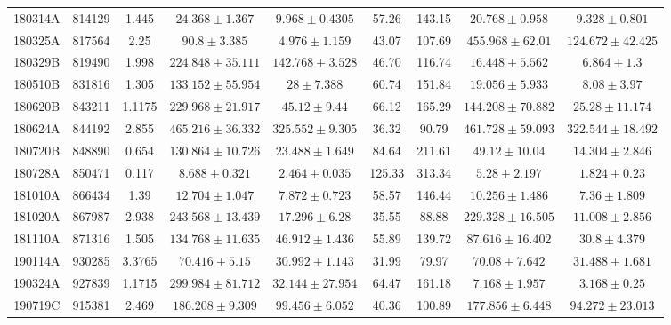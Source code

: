 \documentclass[prd,nofootinbib,preprintnumbers,floatfix]{revtex4}  %
\begin{document}
\begin{center}
\begin{longtable*}{|c|c|c|c|c|c|c|c|c|}
180314A	&	814129	&	1.445	&	$	24.368	\pm	1.367	$	&	$	9.968	\pm	0.4305	$	&	57.26	&	143.15	&	$	20.768	\pm	0.958	$	&	$	9.328	\pm	0.801	$	\\
180325A	&	817564	&	2.25	&	$	90.8	\pm	3.385	$	&	$	4.976	\pm	1.159	$	&	43.07	&	107.69	&	$	455.968	\pm	62.01	$	&	$	124.672	\pm	42.425	$	\\
180329B	&	819490	&	1.998	&	$	224.848	\pm	35.111	$	&	$	142.768	\pm	3.528	$	&	46.70	&	116.74	&	$	16.448	\pm	5.562	$	&	$	6.864	\pm	1.3	$	\\
180510B	&	831816	&	1.305	&	$	133.152	\pm	55.954	$	&	$	28	\pm	7.388	$	&	60.74	&	151.84	&	$	19.056	\pm	5.933	$	&	$	8.08	\pm	3.97	$	\\
180620B	&	843211	&	1.1175	&	$	229.968	\pm	21.917	$	&	$	45.12	\pm	9.44	$	&	66.12	&	165.29	&	$	144.208	\pm	70.882	$	&	$	25.28	\pm	11.174	$	\\
180624A	&	844192	&	2.855	&	$	465.216	\pm	36.332	$	&	$	325.552	\pm	9.305	$	&	36.32	&	90.79	&	$	461.728	\pm	59.093	$	&	$	322.544	\pm	18.492	$	\\
180720B	&	848890	&	0.654	&	$	130.864	\pm	10.726	$	&	$	23.488	\pm	1.649	$	&	84.64	&	211.61	&	$	49.12	\pm	10.04	$	&	$	14.304	\pm	2.846	$	\\
180728A	&	850471	&	0.117	&	$	8.688	\pm	0.321	$	&	$	2.464	\pm	0.035	$	&	125.33	&	313.34	&	$	5.28	\pm	2.197	$	&	$	1.824	\pm	0.23	$	\\
181010A	&	866434	&	1.39	&	$	12.704	\pm	1.047	$	&	$	7.872	\pm	0.723	$	&	58.57	&	146.44	&	$	10.256	\pm	1.486	$	&	$	7.36	\pm	1.809	$	\\
181020A	&	867987	&	2.938	&	$	243.568	\pm	13.439	$	&	$	17.296	\pm	6.28	$	&	35.55	&	88.88	&	$	229.328	\pm	16.505	$	&	$	11.008	\pm	2.856	$	\\
181110A	&	871316	&	1.505	&	$	134.768	\pm	11.635	$	&	$	46.912	\pm	1.436	$	&	55.89	&	139.72	&	$	87.616	\pm	16.402	$	&	$	30.8	\pm	4.379	$	\\
190114A	&	930285	&	3.3765	&	$	70.416	\pm	5.15	$	&	$	30.992	\pm	1.143	$	&	31.99	&	79.97	&	$	70.08	\pm	7.642	$	&	$	31.488	\pm	1.681	$	\\
190324A	&	927839	&	1.1715	&	$	299.984	\pm	81.712	$	&	$	32.144	\pm	27.954	$	&	64.47	&	161.18	&	$	7.168	\pm	1.957	$	&	$	3.168	\pm	0.25	$	\\
190719C	&	915381	&	2.469	&	$	186.208	\pm	9.309	$	&	$	99.456	\pm	6.052	$	&	40.36	&	100.89	&	$	177.856	\pm	6.448	$	&	$	94.272	\pm	23.013	$	\\

\end{longtable*}
\end{center}
\end{document}
